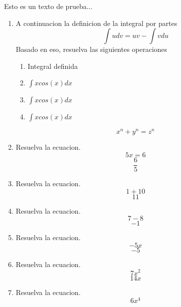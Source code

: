 \documentclass[12pt]{article}%
\begin{document}
%
\normalsize%
\pagestyle{header}%
Esto es un texto de prueba...%
\begin{enumerate}[wide, labelwidth=!, labelindent=0pt,label={Pregunta \arabic*. }]%
\item%
%
A continuacion la definicion de la integral por partes%
\[\int udv=uv-\int vdu\]%
Basado en eso, resuelva las siguientes operaciones%
\begin{enumerate}[wide, labelwidth=!, labelindent=0pt,label={\Alph*) }]%
\item%
%
Integral definida\\%
\item%
%
\(\int xcos(x)dx\)%
\item%
%
\(\int xcos(x)dx\)%
\item%
%
\(\int xcos(x)dx\)%
\end{enumerate}%
\[ x^n + y^n = z^n \]%
\item%
%
Resuelva la ecuacion.%
\begin{equation*}5 x = 6\end{equation*}%
\begin{equation*}\frac{6}{5}\end{equation*}%
\item%
%
Resuelva la ecuacion.%
\begin{equation*}1 + 10\end{equation*}%
\begin{equation*}11\end{equation*}%
\item%
%
Resuelva la ecuacion.%
\begin{equation*}7 - 8\end{equation*}%
\begin{equation*}-1\end{equation*}%
\item%
%
Resuelva la ecuacion.%
\begin{equation*}- 5 x\end{equation*}%
\begin{equation*}-5\end{equation*}%
\item%
%
Resuelva la ecuacion.%
\begin{equation*}7 x^{2}\end{equation*}%
\begin{equation*}14 x\end{equation*}%
\item%
%
Resuelva la ecuacion.%
\begin{equation*}6 x^{4}\end{equation*}%

\end{enumerate}
\end{document}

